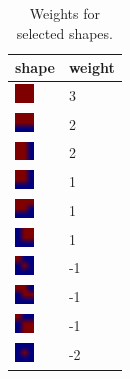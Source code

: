 \documentclass[12pt]{article}
\begin{document}
\begin{table}
    \begin{center}
    \begin{tabular}{| l | l |}
        \hline
        shape & weight \\ \hline
        \includegraphics[width=5mm]{shapes/255.png} & 3\\
        \includegraphics[width=5mm]{shapes/31.png} & 2\\
        \includegraphics[width=5mm]{shapes/107.png} & 2\\
        \includegraphics[width=5mm]{shapes/11.png} & 1\\
        \includegraphics[width=5mm]{shapes/15.png} & 1\\
        \includegraphics[width=5mm]{shapes/22.png} & 1\\
        \includegraphics[width=5mm]{shapes/1.png} & -1\\
        \includegraphics[width=5mm]{shapes/19.png} & -1\\
        \includegraphics[width=5mm]{shapes/209.png} & -1\\
        \includegraphics[width=5mm]{shapes/0.png} & -2\\
        \hline
    \end{tabular}
    \end{center}
    \caption{Weights for selected shapes.}
    \label{table:shapes}
\end{table}
\end{document}
